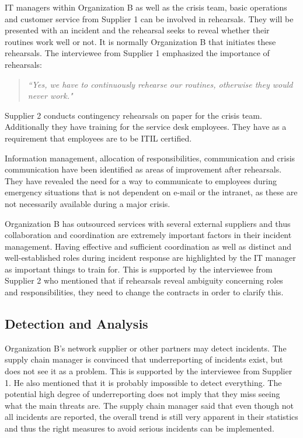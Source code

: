 IT managers within Organization B as well as the crisis team, basic operations and customer service from Supplier 1 can be involved in rehearsals. They will be presented with an incident and the rehearsal seeks to reveal whether their routines work well or not. It is normally Organization B that initiates these rehearsals. The interviewee from Supplier 1 emphasized the importance of rehearsals:

\begin{quote}
\textit{``Yes, we have to continuously rehearse our routines, otherwise they would never work."}
\end{quote}

Supplier 2 conducts contingency rehearsals on paper for the crisis team. Additionally they have training for the service desk employees. They have as a requirement that employees are to be \ac{ITIL} certified.

Information management, allocation of responsibilities, communication and crisis communication have been identified as areas of improvement after rehearsals. They have revealed the need for a way to communicate to employees during emergency situations that is not dependent on e-mail or the intranet, as these are not necessarily available during a major crisis.

Organization B has outsourced services with several external suppliers and thus collaboration and coordination are extremely important factors in their incident management. Having effective and sufficient coordination as well as distinct and well-established roles during incident response are highlighted by the IT manager as important things to train for. This is supported by the interviewee from Supplier 2 who mentioned that if rehearsals reveal ambiguity concerning roles and responsibilities, they need to change the contracts in order to clarify this.

\subsection{Detection and Analysis}
Organization B's network supplier or other partners may detect incidents. The supply chain manager is convinced that underreporting of incidents exist, but does not see it as a problem. This is supported by the interviewee from Supplier 1. He also mentioned that it is probably impossible to detect everything. The potential high degree of underreporting does not imply that they miss seeing what the main threats are. The supply chain manager said that even though not all incidents are reported, the overall trend is still very apparent in their statistics and thus the right measures to avoid serious incidents can be implemented. 

